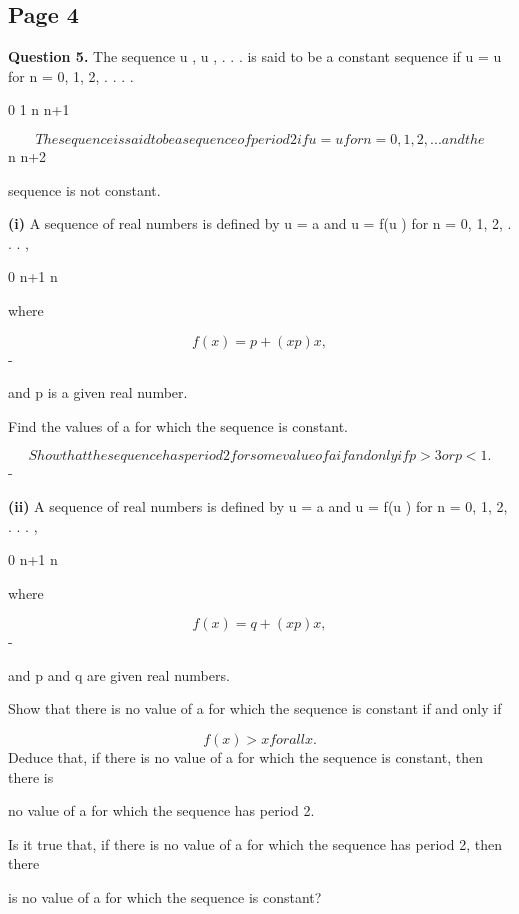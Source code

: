 \documentclass[12pt]{article}
\begin{document}
\subsection*{Page 4}
\begin{flushleft}
\bigskip\textbf{Question 5.} The sequence u , u , . . . is said to be a constant sequence if u = u for n = 0, 1, 2, . . . .\par
0 1 n n+1\par
\[The sequence is said to be a sequence of period 2 if u = u for n = 0, 1, 2, . . . and the\]
n n+2\par
sequence is not constant.\par
\textbf{(i)} A sequence of real numbers is defined by u = a and u = f(u ) for n = 0, 1, 2, . . . ,\par
0 n+1 n\par
where\par
\[f(x) = p + (x p)x,\]
-\par
and p is a given real number.\par
Find the values of a for which the sequence is constant.\par
\[Show that the sequence has period 2 for some value of a if and only if p > 3 or p < 1 .\]
-\par
\textbf{(ii)} A sequence of real numbers is defined by u = a and u = f(u ) for n = 0, 1, 2, . . . ,\par
0 n+1 n\par
where\par
\[f(x) = q + (x p)x,\]
-\par
and p and q are given real numbers.\par
Show that there is no value of a for which the sequence is constant if and only if\par
\[f(x) > x for all x.\]
Deduce that, if there is no value of a for which the sequence is constant, then there is\par
no value of a for which the sequence has period 2.\par
Is it true that, if there is no value of a for which the sequence has period 2, then there\par
is no value of a for which the sequence is constant?\par
\end{flushleft}
\end{document}
